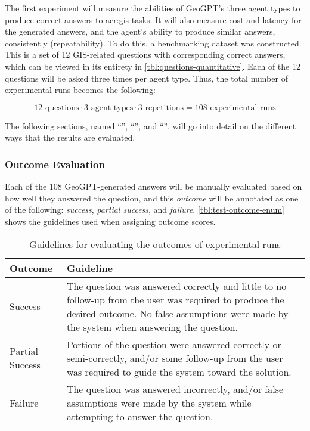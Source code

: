 The first experiment will measure the abilities of GeoGPT's three agent types to produce correct answers to \acrshort{acr:gis} tasks. It will also measure cost and latency for the generated answers, and the agent's ability to produce similar answers, consistently (repeatability). To do this, a benchmarking dataset was constructed. This is a set of 12 GIS-related questions with corresponding correct answers, which can be viewed in its entirety in \autoref{tbl:questions-quantitative}. Each of the 12 questions will be asked three times per agent type. Thus, the total number of experimental runs becomes the following:

$$12 \text{ questions} \cdot 3 \text{ agent types} \cdot 3 \text{ repetitions} = 108 \text{ experimental runs}$$

The following sections, named \enquote{}, \enquote{}, and \enquote{}, will go into detail on the different ways that the results are evaluated.

\subsubsection{Outcome Evaluation}
\label{subsubsec:outcome-evaluation}

Each of the 108 GeoGPT-generated answers will be manually evaluated based on how well they answered the question, and this \textit{outcome} will be annotated as one of the following: \textit{success}, \textit{partial success}, and \textit{failure}. \autoref{tbl:test-outcome-enum} shows the guidelines used when assigning outcome scores.

\begin{table}[htbp]
    \centering
    \caption{Guidelines for evaluating the outcomes of experimental runs}
    \label{tbl:test-outcome-enum}
    \begin{tabularx}{0.9\textwidth}{p{3cm}X}
        \toprule
        \textbf{Outcome} & \textbf{Guideline}                                                                                                                                                                                  \\
        \midrule
        Success          & The question was answered correctly and little to no follow-up from the user was required to produce the desired outcome. No false assumptions were made by the system when answering the question. \\
        Partial Success  & Portions of the question were answered correctly or semi-correctly, and/or some follow-up from the user was required to guide the system toward the solution.                                       \\
        Failure          & The question was answered incorrectly, and/or false assumptions were made by the system while attempting to answer the question.                                                                    \\
        \bottomrule
    \end{tabularx}
\end{table}


